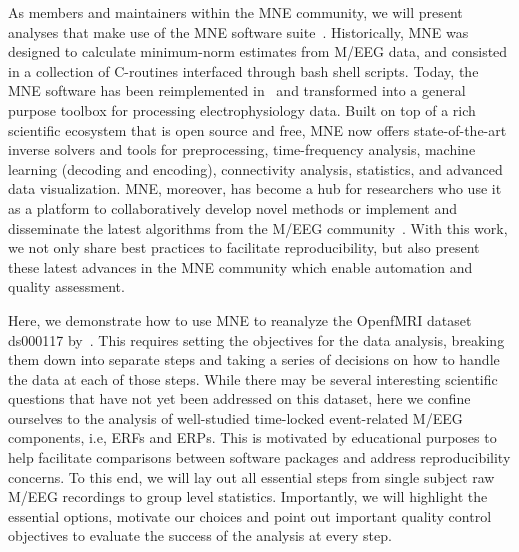 As members and maintainers within the MNE community, we will present analyses that make use of the MNE software suite~\citep{mne}. Historically, MNE was designed to calculate minimum-norm estimates from M/EEG data, and consisted in a collection of C-routines interfaced through bash shell scripts. Today, the MNE software has been reimplemented in~\citep{gramfort2013meg} and transformed into a general purpose toolbox for processing electrophysiology data. Built on top of a rich scientific ecosystem that is open source and free, MNE now offers state-of-the-art inverse solvers and tools for preprocessing, time-frequency analysis, machine learning (decoding and encoding), connectivity analysis, statistics, and advanced data visualization. MNE, moreover, has become a hub for researchers who use it as a platform to collaboratively develop novel methods or implement and disseminate the latest algorithms from the M/EEG community~\citep{engemann2015automated, smith2015regression1, smith2015regression2, haufe2014interpretation, king2014characterizing, gramfort-etal:2013, schurger2013reducing, khan2013note, larson_cortical_2012, hauk2011comparison, gramfort2010graph, rivet2009xdawn, kriegeskorte2008representational, maris_nonparametric_2007}. With this work, we not only  share best practices to facilitate reproducibility, but also present these latest advances in the MNE community which enable automation and quality assessment.

Here, we demonstrate how to use MNE to reanalyze the OpenfMRI dataset ds000117 by~\cite{wakeman2015multi}. This requires setting the objectives for the data analysis, breaking them down into separate steps and taking a series of decisions on how to handle the data at each of those steps. While there may be several interesting scientific questions that have not yet been addressed on this dataset, here we confine ourselves to the analysis of well-studied time-locked event-related M/EEG components, i.e, \acp{ERF} and \acp{ERP}. This is motivated by educational purposes to help facilitate comparisons between software packages and address reproducibility concerns. To this end, we will lay out all essential steps from single subject raw M/EEG recordings to group level statistics. Importantly, we will highlight the essential options, motivate our choices and point out important quality control objectives to evaluate the success of the analysis at every step.

